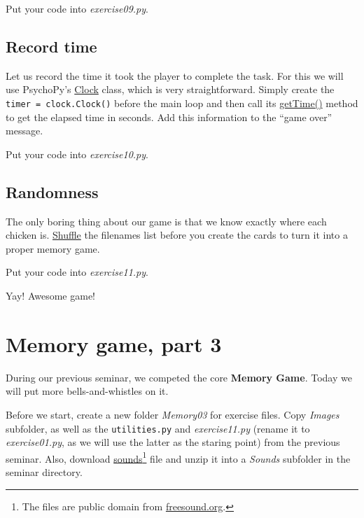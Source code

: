 \documentclass[
]{book}
\begin{document}
Put your code into \emph{exercise09.py}.

\hypertarget{record-time}{%
\section{Record time}\label{record-time}}

Let us record the time it took the player to complete the task. For this we will use PsychoPy's \href{https://psychopy.org/api/clock.html\#psychopy.clock.Clock}{Clock} class, which is very straightforward. Simply create the \texttt{timer\ =\ clock.Clock()} before the main loop and then call its \href{https://psychopy.org/api/clock.html\#psychopy.clock.MonotonicClock.getTime}{getTime()} method to get the elapsed time in seconds. Add this information to the ``game over'' message.

Put your code into \emph{exercise10.py}.

\hypertarget{randomness}{%
\section{Randomness}\label{randomness}}

The only boring thing about our game is that we know exactly where each chicken is. \href{https://docs.python.org/3/library/random.html\#random.shuffle}{Shuffle} the filenames list before you create the cards to turn it into a proper memory game.

Put your code into \emph{exercise11.py}.

Yay! Awesome game!

\hypertarget{seminar11}{%
\chapter{Memory game, part 3}\label{seminar11}}

During our previous seminar, we competed the core \textbf{Memory Game}. Today we will put more bells-and-whistles on it.

Before we start, create a new folder \emph{Memory03} for exercise files. Copy \emph{Images} subfolder, as well as the \texttt{utilities.py} and \emph{exercise11.py} (rename it to \emph{exercise01.py}, as we will use the latter as the staring point) from the previous seminar. Also, download \href{material/sounds.zip}{sounds}\footnote{The files are public domain from \href{https://freesound.org/}{freesound.org}.} file and unzip it into a \emph{Sounds} subfolder in the seminar directory.
\end{document}
